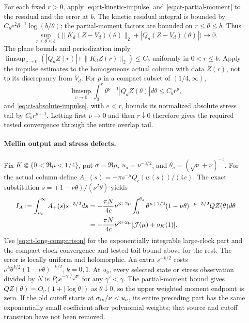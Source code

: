 For each fixed $r>0$, apply \eqref{eq:ct-kinetic-impulse} and
\eqref{eq:ct-partial-moment} to the residual and the error at $b$.
The kinetic residual integral is bounded by
$C_be^2\theta^{-1}\log(b/\theta)$; the partial-moment factors are
bounded on $r\le\theta\le b$. Thus
\begin{equation}\label{eq:ct-compact-comparison}
 \sup_{r\le\theta\le b}
 \bigl(\|K_d(Z-V_d)(\theta)\|_2+
                |Q_d(Z-V_d)(\theta)|\bigr)\longrightarrow0.
\end{equation}
The plane bounds and periodization imply
$\limsup_{\nu\to0}(|Q_dZ(r)|+\|K_dZ(r)\|_2)\le C_b$ uniformly
in $0<r\le b$. Apply the impulse estimates to the homogeneous actual
column with data $Z(r)$, not to its discrepancy from $V_d$.
For $p$ in a compact subset of $(1/4,\infty)$,
\[
 \limsup_{\nu\to0}\int_0^r\theta^{p-1}|Q_dZ(\theta)|d\theta
       \le C_br^p,
\]
and \eqref{eq:ct-absolute-impulse}, with $e<r$, bounds its normalized
absolute stress tail by $C_br^{p+1}$. Letting first $\nu\to0$ and
then $r\downarrow0$ therefore gives the required tested convergence
through the entire overlap tail.

\paragraph{Mellin output and stress defects.}
Fix $K\Subset\{0<\Re\mu<1/4\}$, put $\sigma=\Re\mu$,
$u_o=\nu^{-3/2}$, and $\theta_o=(\sqrt\nu+\nu)^{-1}$.
For the actual column define
$A_+(s)=-\pi s^{-\mu}Q_c(w(s))/(4c)$.
The exact substitution
$s=(1-\nu\theta)/(\nu^2\theta)$ yields
\begin{align}
 I_A:=\int_{u_o}^{\infty}A_+(s)s^{-5/2}ds
 &=-\frac{\pi N}{4c}\nu^{3+2\mu}
   \int_0^{\theta_o}\theta^{\mu+1/2}
       (1-\nu\theta)^{-\mu-5/2}QZ(\theta)d\theta \notag\\
 &=-\frac{\pi N}{4c}\nu^{3+2\mu}
       [\mathcal J(\mu)+o_K(1)].
                                      \label{eq:ct-mellin}
\end{align}
Use \eqref{eq:ct-long-comparison} for the exponentially integrable
large-clock part and the compact-clock convergence and tested tail
bound above for the rest. The error is locally uniform and holomorphic.
An extra $s^{-k/2}$ costs
$\nu^k\theta^{k/2}(1-\nu\theta)^{-k/2}$, $k=0,1$.
At $u_o$, every selected state or stress observation divided by $N$
is $P_\nu e^{-\gamma'/\sqrt\nu}$ for any $\gamma'<\gamma$.
The partial-moment bound gives $QZ(\theta)=O_\nu(1+|\log\theta|)$
as $\theta\downarrow0$, so the upper weighted moment endpoint is zero.
If the old cutoff
starts at $\sigma_{\rm in}/\nu<u_o$, its entire preceding part
has the same exponentially small coefficient after polynomial
weights; that source and cutoff transition have not been removed.

